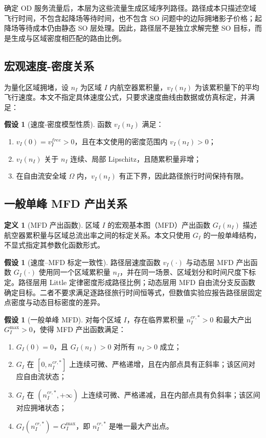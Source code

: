\documentclass[a4paper,12pt]{article}
\theoremstyle{plain}
\theoremstyle{definition}
\newtheorem{definition}[theorem]{定义}
\newtheorem{assumption}[theorem]{假设}
\theoremstyle{remark}
\begin{document}
确定 OD 服务流量后，本层为这些流量生成区域序列路径。路径成本只描述空域飞行时间，不包含起降场等待时间，也不包含 SO 问题中的边际拥堵影子价格；起降场等待成本仍由静态 SO 层处理。因此，路径层不是独立求解完整 SO 目标，而是生成与区域密度相匹配的路由比例。

\subsection{宏观速度-密度关系}
为量化区域拥堵，设 $n_I$ 为区域 $I$ 内航空器累积量，$v_I(n_I)$ 为该累积量下的平均飞行速度。本文不指定具体速度公式，只要求速度曲线由数据或仿真标定，并满足：
\begin{assumption}[速度-密度模型性质]\label{asm:speed_density}
函数 $v_I(n_I)$ 满足：
\begin{enumerate}
    \item $v_I(0)=v_{I}^{free}>0$，且在本文使用的密度范围内 $v_I(n_I)>0$；
    \item $v_I(n_I)$ 关于 $n_I$ 连续、局部 Lipschitz，且随累积量非增；
    \item 在自由流安全域 $\Omega$ 内，$v_I(n_I)$ 有正下界，因此路径旅行时间保持有限。
\end{enumerate}
\end{assumption}

\subsection{一般单峰 MFD 产出关系}\label{subsec:mfd_derivation}

\begin{definition}[MFD 产出函数]\label{def:mfd}
区域 $I$ 的宏观基本图（MFD）产出函数 $G_I(n_I)$ 描述航空器累积量与区域总流出率之间的标定关系。本文只使用 $G_I$ 的一般单峰结构，不显式指定其参数化函数形式。
\end{definition}

\begin{assumption}[速度--MFD 标定一致性]\label{asm:calibration_consistency}
路径层速度函数 $v_I(\cdot)$ 与动态层 MFD 产出函数 $G_I(\cdot)$ 使用同一个区域累积量 $n_I$，并在同一场景、区域划分和时间尺度下标定。路径层用 Little 定律密度形成路径比例；动态层用 MFD 自由流分支反函数确定目标。二者不要求满足逐路径旅行时间恒等式，但数值实验应报告路径层固定点密度与动态目标密度的差异。
\end{assumption}

\begin{assumption}[一般单峰 MFD]\label{asm:mfd_unimodal}
对每个区域 $I$，存在临界累积量 $n_I^{cr,*}>0$ 和最大产出 $G_I^{\max}>0$，使得 MFD 产出函数满足：
\begin{enumerate}
    \item $G_I(0)=0$，且 $G_I(n_I)>0$ 对所有 $n_I>0$ 成立；
    \item $G_I$ 在 $[0,n_I^{cr,*}]$ 上连续可微、严格递增，且在内部点具有正斜率；该区间对应自由流状态；
    \item $G_I$ 在 $(n_I^{cr,*},+\infty)$ 上连续可微、严格递减，且在内部点具有负斜率；该区间对应拥堵状态；
    \item $G_I(n_I^{cr,*})=G_I^{\max}$，即 $n_I^{cr,*}$ 是唯一最大产出点。
\end{enumerate}
\end{assumption}
\end{document}
